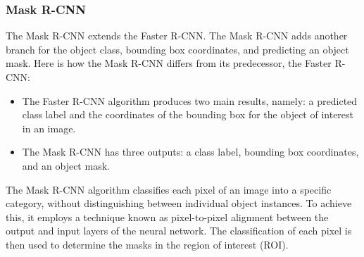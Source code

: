 \subsubsection{Mask R-CNN}
The Mask R-CNN extends the Faster R-CNN. The Mask R-CNN adds another branch for the object class, bounding box coordinates, and predicting an object mask.
Here is how the Mask R-CNN differs from its predecessor, the Faster R-CNN:
\begin{itemize}
    \item The Faster R-CNN algorithm produces two main results, namely: a predicted class label and the coordinates of the bounding box for the object of interest in an image.
    \item The Mask R-CNN has three outputs: a class label, bounding box coordinates, and an object mask.
\end{itemize}
The Mask R-CNN algorithm classifies each pixel of an image into a specific category, without distinguishing between individual object instances. To achieve this, it employs a technique known as pixel-to-pixel alignment between the output and input layers of the neural network. The classification of each pixel is then used to determine the masks in the region of interest (ROI).\cite{he2017mask}

